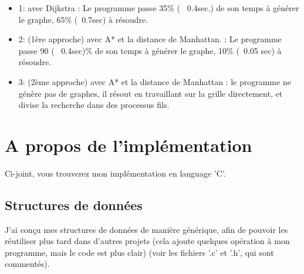 \documentclass[10pt]{article}
\begin{document}
			\begin{itemize}[label=-]
				\setlength\itemsep{0.1em}
				\item 1: avec Dijkstra : Le programme passe 35\% (~ 0.4sec.) de son temps à générer le graphe, 65\% (~0.7sec) à résoudre.
				\item 2: (1ère approche) avec A* et la distance de Manhattan. : Le programme passe 90 (~ 0.4sec)\%
				de son temps à générer le graphe, 10\% (~0.05 sec) à résoudre.
				\item 3: (2ème approche) avec A* et la distance de Manhattan : le programme ne génère pas de graphes, il résout
				en travaillant sur la grille directement, et divise la recherche dans des processus fils.
			\end{itemize}

	\section{A propos de l'implémentation}
		Ci-joint, vous trouverez mon implémentation en language 'C'.
		\subsection{Structures de données}
		J'ai conçu mes structures de données de manière générique, afin de pouvoir les réutiliser plus tard dans d'autres projets
		(cela ajoute quelques opération à mon programme, mais le code est plus clair) (voir les fichiers '.c' et '.h', qui sont commentés).
\end{document}
